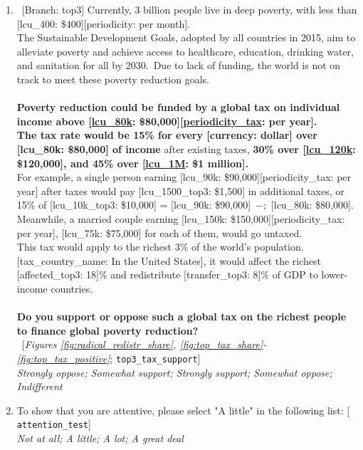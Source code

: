 \begin{enumerate}[resume]
\item ~[Branch: top3] \label{q:top3_tax_support} Currently, 3 billion people live in deep poverty, with less than [lcu\_400: \$400][periodicity: per month].\\The Sustainable Development Goals, adopted by all countries in 2015, aim to alleviate poverty and achieve access to healthcare, education, drinking water, and sanitation for all by 2030.~Due to lack of funding, the world is not on track to meet these poverty reduction goals.\\\\\textbf{Poverty reduction could be funded by a global tax on individual income above [\hyperlink{tab_features}{lcu\_80k}: \$80,000][\hyperlink{tab_features}{periodicity\_tax}: per year].~\\The tax rate would be 15\% for every [currency: dollar] over [lcu\_80k: \$80,000] of income} after existing taxes, \textbf{30\% over [\hyperlink{tab_features}{lcu\_120k}: \$120,000], and 45\% over [\hyperlink{tab_features}{lcu\_1M}: \$1 million].~}\\For example, a single person earning [lcu\_90k: \$90,000][periodicity\_tax: per year] after taxes would pay [lcu\_1500\_top3: \$1,500] in additional taxes, or 15\% of [lcu\_10k\_top3: \$10,000] = [lcu\_90k: \$90,000]~$-$;~[lcu\_80k: \$80,000]. Meanwhile, a married couple earning [lcu\_150k: \$150,000][periodicity\_tax: per year], [lcu\_75k: \$75,000] for each of them, would go untaxed.\\This tax would apply to the richest 3\% of the world's population. [tax\_country\_name: In the United States], it would affect the richest [affected\_top3: 18]\% and redistribute [transfer\_top3: 8]\% of GDP to lower-income countries.\\\\\textbf{Do you support or oppose such a global tax on the richest people to finance global poverty reduction?}\\ 
~[\textit{Figures \ref{fig:radical_redistr_share}, \ref{fig:top_tax_share}-\ref{fig:top_tax_positive}}; 
\verb|top3_tax_support|]
  \\ \textit{Strongly oppose; Somewhat support; Strongly support; Somewhat oppose; Indifferent}

\item  \label{q:attention_test} To show that you are attentive, please select "A little" in the following list: [%
\verb|attention_test|]
  \\ \textit{Not at all; A little; A lot; A great deal}

\end{enumerate} 

